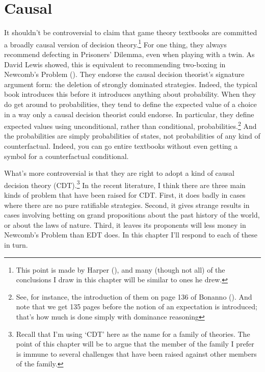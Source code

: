 \documentclass[
  12pt,
  letterpaper,
  DIV=11,
  numbers=noendperiod]{scrreprt}
\begin{document}

\chapter{Causal}\label{sec-causal}

It shouldn't be controversial to claim that game theory textbooks are
committed a broadly causal version of decision theory.\footnote{This
  point is made by Harper (), and many
  (though not all) of the conclusions I draw in this chapter will be
  similar to ones he drew.} For one thing, they always recommend
defecting in Prisoners' Dilemma, even when playing with a twin. As David
Lewis showed, this is equivalent to recommending two-boxing in Newcomb's
Problem (). They endorse the causal
decision theorist's signature argument form: the deletion of strongly
dominated strategies. Indeed, the typical book introduces this before it
introduces anything about probability. When they do get around to
probabilities, they tend to define the expected value of a choice in a
way only a causal decision theorist could endorse. In particular, they
define expected values using unconditional, rather than conditional,
probabilities.\footnote{See, for instance, the introduction of them on
  page 136 of Bonanno (). And note that
  we get 135 pages before the notion of an expectation is introduced;
  that's how much is done simply with dominance reasoning} And the
probabilities are simply probabilities of states, not probabilities of
any kind of counterfactual. Indeed, you can go entire textbooks without
even getting a symbol for a counterfactual conditional.

What's more controversial is that they are right to adopt a kind of
causal decision theory (CDT).\footnote{Recall that I'm using `CDT' here
  as the name for a family of theories. The point of this chapter will
  be to argue that the member of the family I prefer is immune to
  several challenges that have been raised against other members of the
  family.} In the recent literature, I think there are three main kinds
of problem that have been raised for CDT. First, it does badly in cases
where there are no pure ratifiable strategies. Second, it gives strange
results in cases involving betting on grand propositions about the past
history of the world, or about the laws of nature. Third, it leaves its
proponents will less money in Newcomb's Problem than EDT does. In this
chapter I'll respond to each of these in turn.
\end{document}
